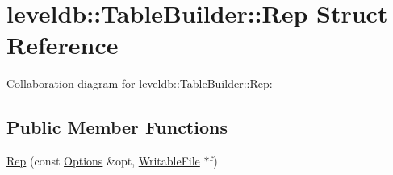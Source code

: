 \hypertarget{structleveldb_1_1_table_builder_1_1_rep}{}\section{leveldb\+:\+:Table\+Builder\+:\+:Rep Struct Reference}
\label{structleveldb_1_1_table_builder_1_1_rep}


Collaboration diagram for leveldb\+:\+:Table\+Builder\+:\+:Rep\+:
\subsection*{Public Member Functions}
\begin{DoxyCompactItemize}
\item 
\hyperlink{structleveldb_1_1_table_builder_1_1_rep_a9d68c60c57e7336aa1fd10fc9f32213e}{Rep} (const \hyperlink{structleveldb_1_1_options}{Options} \&opt, \hyperlink{classleveldb_1_1_writable_file}{Writable\+File} $\ast$f)
\end{DoxyCompactItemize}
